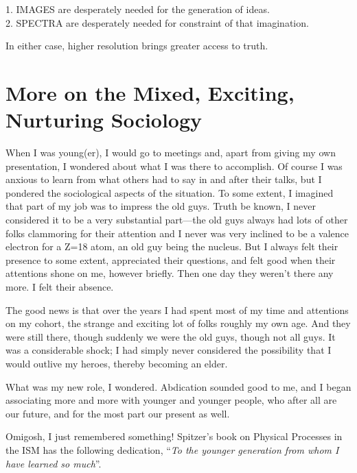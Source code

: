 \documentclass[proceedings]{rmaa}
\begin{document}
\noindent\hspace*{6em}1. IMAGES  are desperately needed for the generation of ideas.  \\
\hspace*{6em}2. SPECTRA  are desperately needed for constraint of that imagination.

In either case, higher resolution brings greater access to truth.
\vspace*{-0.75ex}

\section{More on the Mixed, Exciting, Nurturing Sociology}
\vspace*{-0.75ex}

When I was young(er), I would go to meetings and, apart from giving my 
own presentation, I wondered about what I was there to accomplish.  Of 
course I was anxious to learn from what others had to say in and after 
their talks, but I pondered the sociological aspects of the situation.  
To some extent, I imagined that part of my job was to impress the old 
guys.  Truth be known, I never considered it to be a very substantial 
part---the old guys always had lots of other folks clammoring for their 
attention and I never was very inclined to be a valence electron for a 
Z=18 atom, an old guy being the nucleus.  But I always felt their 
presence to some extent, appreciated their questions, and felt good when  
their attentions shone on me, however briefly.  Then one day they weren't 
there any more.  I felt their absence.  

        The good news is that over the years I had spent most of my time 
and attentions on my cohort, the strange and exciting lot of folks 
roughly my own age.  And they were still there, though suddenly we were 
the old guys, though not all guys.  It was a considerable shock; I had 
simply never considered the possibility that I would outlive my heroes, 
thereby becoming an elder.  

        What was my new role, I wondered.  Abdication sounded good to me, 
and I began associating more and more with younger and younger people, 
who after all are our future, and for the most part our present as well.

        Omigosh, I just remembered something!  Spitzer's book on Physical 
Processes in the ISM has the following dedication, ``{\it To the younger 
generation from whom I have learned so much}''.
\end{document}

